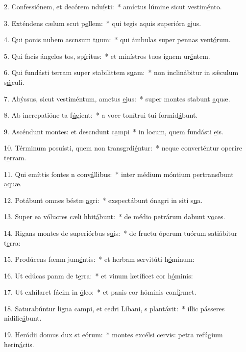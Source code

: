 2. Confessiónem, et decórem ndu\uline{í}sti:~* amíctus lúmine sicut vestim\uline{é}nto.\par 
3. Exténdens cælum scut p\uline{e}llem:~* qui tegis aquis superióra \uline{e}jus.\par 
4. Qui ponis nubem ascnsum t\uline{u}um:~* qui ámbulas super pennas vent\uline{ó}rum.\par 
5. Qui facis ángelos tos, sp\uline{í}ritus:~* et minístros tuos ignem ur\uline{é}ntem.\par 
6. Qui fundásti terram super stabilittem s\uline{u}am:~* non inclinábitur in sǽculum s\uline{ǽ}culi.\par 
7. Abýssus, sicut vestiméntum, amctus \uline{e}jus:~* super montes stabunt \uline{a}quæ.\par 
8. Ab increpatióne ta f\uline{ú}gient:~* a voce tonítrui tui formid\uline{á}bunt.\par 
9. Ascéndunt montes: et descndunt c\uline{a}mpi~* in locum, quem fundásti \uline{e}is.\par 
10. Términum posuísti, quem non transgrdi\uline{é}ntur:~* neque converténtur operíre t\uline{e}rram.\par 
11. Qui emíttis fontes n conv\uline{á}llibus:~* inter médium móntium pertransíbunt \uline{a}quæ.\par 
12. Potábunt omnes béstæ \uline{a}gri:~* exspectábunt ónagri in siti s\uline{u}a.\par 
13. Super ea vólucres cæli hbit\uline{á}bunt:~* de médio petrárum dabunt v\uline{o}ces.\par 
14. Rigans montes de superiórbus s\uline{u}is:~* de fructu óperum tuórum satiábitur t\uline{e}rra:\par 
15. Prodúcens fœnm jum\uline{é}ntis:~* et herbam servitúti h\uline{ó}minum:\par 
16. Ut edúcas panm de t\uline{e}rra:~* et vinum lætíficet cor h\uline{ó}minis:\par 
17. Ut exhílaret fácim in \uline{ó}leo:~* et panis cor hóminis conf\uline{í}rmet.\par 
18. Saturabúntur ligna campi, et cedri Líbani, s plant\uline{á}vit:~* illic pásseres nidific\uline{á}bunt.\par 
19. Heródii domus dux st e\uline{ó}rum:~* montes excélsi cervis: petra refúgium herin\uline{á}ciis.\par 
